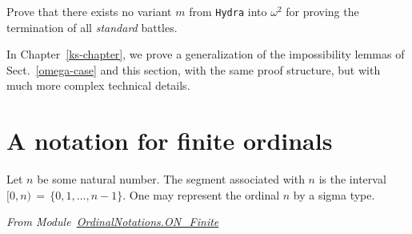   


\begin{exercise}
Prove that there exists no variant $m$ from \texttt{Hydra} into $\omega^2$ for proving
    the  termination of all \emph{standard} battles.
\end{exercise}



\begin{remark}
In Chapter~\ref{ks-chapter}, we  prove a generalization of the impossibility lemmas of
Sect.~\ref{omega-case} and this section, with the same proof structure, but with much more 
complex technical details.
 \end{remark}





  


\section{A notation for finite ordinals}


Let $n$ be some natural number. The segment associated with $n$ is the interval 
$[0,n)\,=\,\{0,1,\dots,n-1\}$. 
One may represent the ordinal $n$ by a sigma type.


\vspace{4pt}
\noindent\emph{From Module~\href{../theories/html/hydras.OrdinalNotations.ON_Finite.html}{OrdinalNotations.ON\_Finite}}

